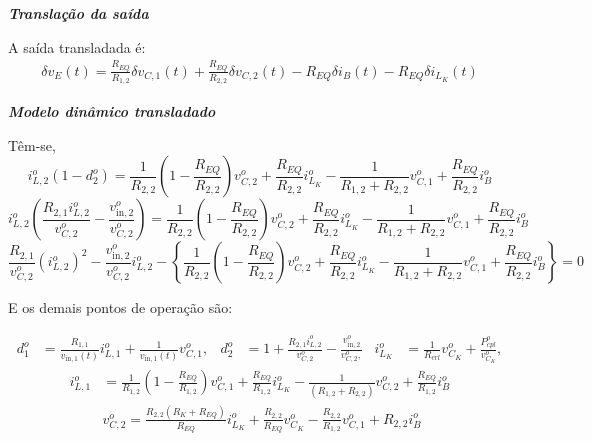 \textbf{\textit{Translação da saída}} \vspace*{12pt}

A saída transladada é:
\begin{gather}
  \delta v_E(t) = \frac{R_{EQ}}{R_{1,2}} \delta v_{C,1}(t) + \frac{R_{EQ}}{R_{2,2}} \delta v_{C,2}(t) - R_{EQ} \delta i_B(t) - R_{EQ} \delta i_{L_K}(t)
\end{gather}


\textbf{\textit{Modelo dinâmico transladado}} \vspace*{12pt}

Têm-se,
\begin{equation*}
  i_{L,2}^o \left(1 - d_2^o\right) = \frac{1}{R_{2,2}} \left(1 - \frac{R_{EQ}}{R_{2,2}}\right) v_{C,2}^o + \frac{R_{EQ}}{R_{2,2}} i_{L_K}^o - \frac{1} {R_{1,2} + R_{2,2}} v_{C,1}^o + \frac{R_{EQ}}{R_{2,2}} i_B^o
\end{equation*}
\begin{equation*}
  i_{L,2}^o \left(\frac{R_{2,1}i_{L,2}^o}{v_{C,2}^o} - \frac{v_{\text{in},2}^o}{v_{C,2}^o}\right) = \frac{1}{R_{2,2}} \left(1 - \frac{R_{EQ}}{R_{2,2}}\right) v_{C,2}^o + \frac{R_{EQ}}{R_{2,2}} i_{L_K}^o - \frac{1} {R_{1,2} + R_{2,2}} v_{C,1}^o + \frac{R_{EQ}}{R_{2,2}} i_B^o
\end{equation*}
\begin{equation*}
  \frac{R_{2,1}}{v_{C,2}^o}({i_{L,2}^o})^2 - \frac{v_{\text{in},2}^o}{v_{C,2}^o}{i_{L,2}^o}
  - \left\{\frac{1}{R_{2,2}} \left(1 - \frac{R_{EQ}}{R_{2,2}}\right) v_{C,2}^o + \frac{R_{EQ}}{R_{2,2}} i_{L_K}^o - \frac{1} {R_{1,2} + R_{2,2}} v_{C,1}^o + \frac{R_{EQ}}{R_{2,2}} i_B^o \right\} = 0
\end{equation*}

E os demais pontos de operação são:

\begin{align}
  d_1^o     & = \frac{R_{1,1}}{v_{\text{in}, 1}(t)} i_{L,1}^o + \frac{1}{v_{\text{in}, 1}(t)} v_{C,1}^o, &
  d_2^o     & = 1 + \frac{R_{2,1}i_{L,2}^o}{v_{C,2}^o} - \frac{v_{\text{in},2}^o}{v_{C,2}^o,}                        &
  i_{L_K}^o & = \frac{1}{R_{crl}} v_{C_K}^o + \frac{P_{cpl}^o}{v_{C_K}^o},
\end{align}
\begin{align}
  i_{L,1}^o & = \frac{1}{R_{1,2}} \left(1 - \frac{R_{EQ}}{{R_{1,2}}}\right) v_{C,1}^o + \frac{R_{EQ}}{R_{1,2} } i_{L_K}^o - \frac{1}{ (R_{1,2} + R_{2,2})} v_{C,2}^o + \frac{R_{EQ}}{R_{1,2}} i_B^o\\[12pt]
            & v_{C,2}^o = \frac{R_{2,2}(R_K + R_{EQ})}{R_{EQ}} i_{L_K}^o + \frac{R_{2,2}}{R_{EQ}} v_{C_K}^o - \frac{R_{2,2}}{{R_{1,2}}} v_{C,1}^o + R_{2,2}i_B^o
\end{align}


